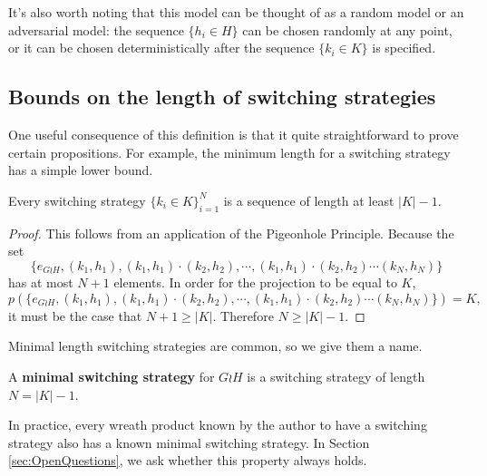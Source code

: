 It's also worth noting that this model can be thought of as a random model or an
adversarial model: the sequence $\{h_i \in H\}$ can be chosen
randomly at any point, or it can be chosen deterministically
after the sequence $\{k_i \in K\}$ is specified.

\subsection{Bounds on the length of switching strategies}

One useful consequence of this definition is that it quite straightforward to
prove certain propositions. For example, the minimum length for a switching strategy
has a simple lower bound.
\begin{proposition}
  Every switching strategy $\{k_i \in K\}_{i=1}^{N}$ is a sequence of
  length at least ${|K| - 1}$.
\end{proposition}
\begin{proof}
  This follows from an application of the Pigeonhole Principle. Because the set
  \begin{equation}
    \{e_{G \wr H}, (k_1, h_1), (k_1, h_1)\cdot(k_2, h_2), \cdots, (k_1, h_1)\cdot(k_2, h_2)\cdots(k_N, h_N)\}
  \end{equation}
  has at most $N+1$ elements. In order for the projection to be equal to $K$,
  \begin{equation}
    p(\{e_{G \wr H}, (k_1, h_1), (k_1, h_1)\cdot(k_2, h_2), \cdots, (k_1, h_1)\cdot(k_2, h_2)\cdots(k_N, h_N)\}) = K,
  \end{equation} it must be the case that $N+1 \geq |K|$.
  Therefore $N \geq |K| - 1$.
\end{proof}

Minimal length switching strategies are common, so we give them a name.
\begin{definition}
  A \textbf{minimal switching strategy} for $G \wr H$ is a switching strategy
  of length $N = |K| - 1.$
\end{definition}

In practice, every wreath product known by the author to have a switching
strategy also has a known minimal switching strategy.
In Section \ref{sec:OpenQuestions}, we ask whether this property always holds.


